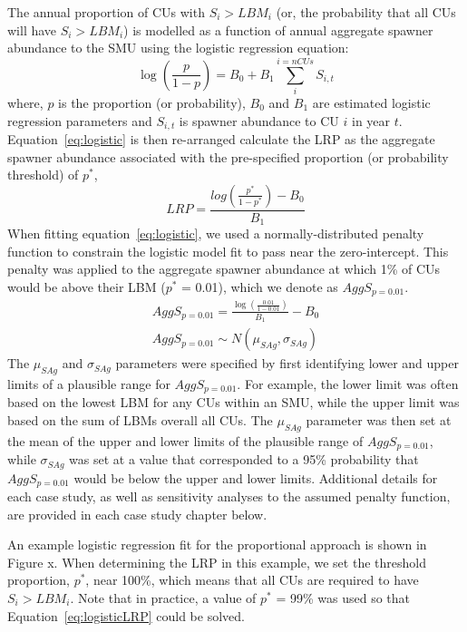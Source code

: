 \documentclass[11pt]{book}
\begin{document}
The annual proportion of CUs with \(S_i > LBM_i\) (or, the probability that all CUs will have \(S_i > LBM_i\)) is modelled as a function of annual aggregate spawner abundance to the SMU using the logistic regression equation: \begin{equation}
  \log(\frac{p}{1-p}) = B_0 + B_1 \sum_{i}^{i=nCUs} S_{i,t}
   \label{eq:logistic}
\end{equation}
where, \(p\) is the proportion (or probability), \(B_0\) and \(B_1\) are estimated logistic regression parameters and \(S_{i,t}\) is spawner abundance to CU \(i\) in year \(t\). Equation~\ref{eq:logistic} is then re-arranged calculate the LRP as the aggregate spawner abundance associated with the pre-specified proportion (or probability threshold) of \(p^*\),
\begin{equation}
  LRP = \frac{log(\frac{p^*}{1-p^*}) - B_0}{B_1}
  \label{eq:logisticLRP}
\end{equation}
When fitting equation~\ref{eq:logistic}, we used a normally-distributed penalty function to constrain the logistic model fit to pass near the zero-intercept. This penalty was applied to the aggregate spawner abundance at which 1\% of CUs would be above their LBM (\(p^*\) = 0.01), which we denote as \(AggS_{p=0.01}\).
\begin{equation}
\begin{split}
  AggS_{p=0.01} = \frac{\log(\frac{0.01}{1-0.01})}{B_1} - B_0 \\
  AggS_{p=0.01} \sim N(\mu_{SAg}, \sigma_{SAg})
  \label{eq:logisticPen}
\end{split}
\end{equation}
The \(\mu_{SAg}\) and \(\sigma_{SAg}\) parameters were specified by first identifying lower and upper limits of a plausible range for \(AggS_{p=0.01}\). For example, the lower limit was often based on the lowest LBM for any CUs within an SMU, while the upper limit was based on the sum of LBMs overall all CUs. The \(\mu_{SAg}\) parameter was then set at the mean of the upper and lower limits of the plausible range of \(AggS_{p=0.01}\), while \(\sigma_{SAg}\) was set at a value that corresponded to a 95\% probability that \(AggS_{p=0.01}\) would be below the upper and lower limits. Additional details for each case study, as well as sensitivity analyses to the assumed penalty function, are provided in each case study chapter below.

An example logistic regression fit for the proportional approach is shown in Figure x. When determining the LRP in this example, we set the threshold proportion, \(p^*\), near 100\%, which means that all CUs are required to have \(S_i > LBM_i\). Note that in practice, a value of \(p^*\) = 99\% was used so that Equation~\ref{eq:logisticLRP} could be solved.
\end{document}
